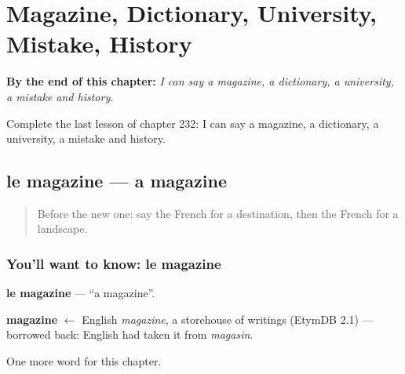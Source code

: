 
\chapter{Magazine, Dictionary, University, Mistake, History}
\label{ch:fr-magazine-dictionary-university-mistake-history}

\begin{chapteropening}
\textbf{By the end of this chapter:} \emph{I can say a magazine, a dictionary, a university, a mistake and history.}

Complete the last lesson of chapter 232: I can say a magazine, a dictionary, a university, a mistake and history.
\end{chapteropening}

\section[le magazine]{le magazine — a magazine}

\label{lesson:FR-C232-magazine}



\begin{quote}
Before the new one: say the French for a destination, then the French for a landscape.
\end{quote}

\subsection*{You'll want to know: le magazine}
\textbf{le magazine} — \textquotedblleft{}a magazine\textquotedblright{}.

\begin{cousinweb}
\textbf{magazine} $\leftarrow$ English \emph{magazine}, a storehouse of writings (EtymDB 2.1) — borrowed back: English had taken it from \emph{magasin}.
\end{cousinweb}

\begin{grammarlens}[title={What you've built}]
One more word for this chapter.
\end{grammarlens}

